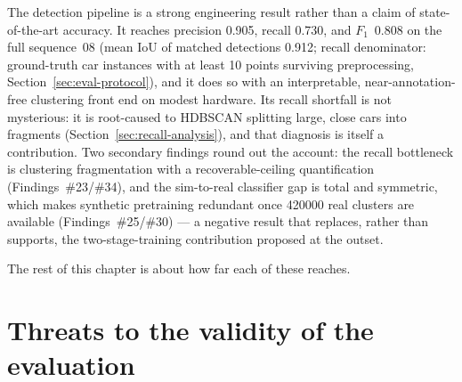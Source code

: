 The detection pipeline is a strong engineering result rather than a claim of
state-of-the-art accuracy. It reaches precision \num{0.905}, recall \num{0.730}, and
$F_1$~\num{0.808} on the full sequence~08 (mean IoU of matched detections \num{0.912};
recall denominator: ground-truth car instances with at least \num{10} points surviving
preprocessing, Section~\ref{sec:eval-protocol}), and it does so with an interpretable, near-annotation-free
clustering front end on modest hardware. Its recall shortfall is not mysterious: it is
root-caused to HDBSCAN splitting large, close cars into fragments (Section~\ref{sec:recall-analysis}), and that
diagnosis is itself a contribution. Two secondary findings round out the account: the
recall bottleneck is clustering fragmentation with a recoverable-ceiling quantification
(Findings~\#23/\#34), and the sim-to-real classifier gap is total and symmetric, which
makes synthetic pretraining redundant once \num{420000} real clusters are available
(Findings~\#25/\#30) --- a negative result that replaces, rather than supports, the
two-stage-training contribution proposed at the outset.

The rest of this chapter is about how far each of these reaches.

\section{Threats to the validity of the evaluation}
\label{sec:disc-eval-validity}

